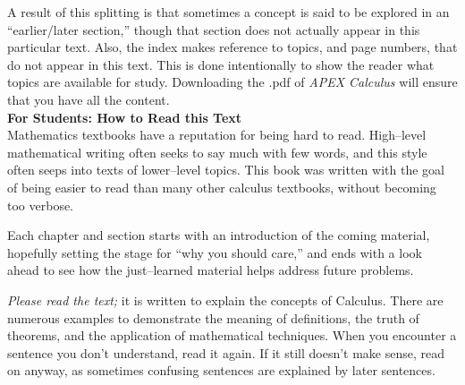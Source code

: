 A result of this splitting is that sometimes a concept is said to be explored in an ``earlier/later section,'' though that section does not actually appear in this particular text. Also, the index makes reference to topics, and page numbers, that do not appear in this text. This is done intentionally to show the reader what topics are available for study.  Downloading the .pdf of \textit{APEX Calculus} will ensure that you have all the content.\\ 


\noindent\textbf{\large For Students: How to Read this Text}\\

Mathematics textbooks have a reputation for being hard to read. High--level mathematical writing often seeks to say much with few words, and this style often seeps into texts of lower--level topics. This book was written with the goal of being easier to read than many other calculus textbooks, without becoming too verbose. 

Each chapter and section starts with an introduction of the coming material, hopefully setting the stage for ``why you should care,'' and ends with a look ahead to see how the just--learned material helps address future problems. 

\textit{Please read the text;} it is written to explain the concepts of Calculus. There are numerous examples to demonstrate the meaning of definitions, the truth of theorems, and the application of mathematical techniques. When you encounter a sentence you don't understand, read it again. If it still doesn't make sense, read on anyway, as sometimes confusing sentences are explained by later sentences.

